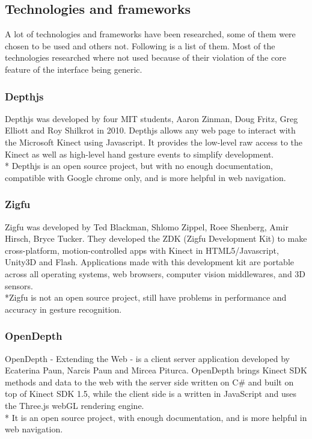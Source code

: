 \documentclass[a4paper]{article}
\begin{document}
\subsection{Technologies and frameworks}
A lot of technologies and frameworks have been researched, some of them were chosen to be used and others not. Following is a list of them.
Most of the technologies researched where not used because of their violation of the core feature of the interface being generic.

\subsubsection{Depthjs}
Depthjs was developed by four MIT students, Aaron Zinman, Doug Fritz, Greg Elliott and Roy Shilkrot in 2010. Depthjs allows any web page to interact with the Microsoft Kinect using Javascript. It provides the low-level raw access to the Kinect as well as high-level hand gesture events to simplify development.
\\* Depthjs is an open source project, but with no enough documentation, compatible with Google chrome only, and is more helpful in web navigation.

\subsubsection{Zigfu}
Zigfu was developed by Ted Blackman, Shlomo Zippel, Roee Shenberg, Amir Hirsch, Bryce Tucker. They developed the ZDK (Zigfu Development Kit) to make cross-platform, motion-controlled apps with Kinect in HTML5/Javascript, Unity3D and Flash. Applications made with this development kit are portable across all operating systems, web browsers, computer vision middlewares, and 3D sensors. 
\\*Zigfu is not an open source project, still have problems in performance and accuracy in gesture recognition.


\subsubsection{OpenDepth}
OpenDepth - Extending the Web - is a client server application developed by Ecaterina Paun, Narcis Paun and Mircea Piturca. OpenDepth brings Kinect SDK methods and data to the web with the server side written on C\# and built on top of Kinect SDK 1.5, while the client side is a written in JavaScript and uses the Three.js webGL rendering engine.
\\* It is an open source project, with enough documentation, and is more helpful in web navigation.
\end{document}
